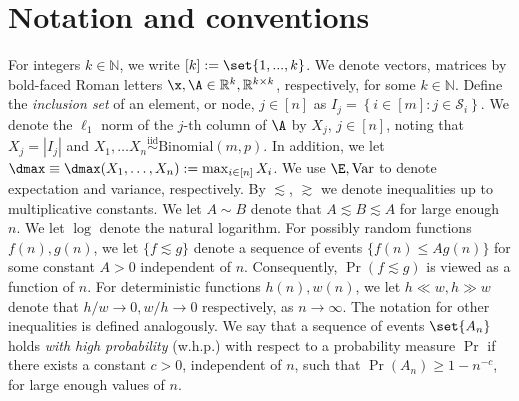 \section{Notation and conventions}\label{sec:notation}
For integers $k \in \mathbb{N}$, we write $[k]:=\set{1,...,k}$. 
We denote vectors, matrices by bold-faced Roman letters $\x, \A \in \mathbb{R}^k, \mathbb{R}^{k \times k}$, respectively, for some $k \in \mathbb{N}$. 
Define the \emph{inclusion set} of an element, or node, $j \in [n]$ as $I_j = \left\{i \in [m] : j \in \mathcal{S}_i \right\}$. 
We denote the $\ell_1$ norm of the $j$-th column of $\A$ by $X_j$, $j\in [n]$, noting that $X_j = |I_j|$ and $X_1, \ldots X_n \overset{\text{iid}}{\sim} \mathrm{Binomial}(m, p)$. 
In addition, we let $\dmax \equiv \dmax(X_1, \ldots, X_n) := \max_{i \in [n]} X_i$. 
We use $\E, \text{Var}$ to denote expectation and variance, respectively. 
By $\lesssim$, $\gtrsim$ we denote inequalities up to multiplicative constants. 
We let $A \sim B$ denote that $A \lesssim B \lesssim A$ for large enough $n$. 
We let $\log$ denote the natural logarithm. 
For possibly random functions \(f(n), g(n)\), we let \(\{f \lesssim g\}\) denote a sequence of events \(\{f(n) \leq A g(n)\}\) for some constant \(A > 0\) independent of \(n\). 
Consequently, \(\Pr(f \lesssim g)\) is viewed as a function of \(n\). For deterministic functions $h(n), w(n)$, we let $h \ll w, h \gg w$ denote that $h/w \to 0, w/h \to 0$ respectively, as $n \to \infty$. 
The notation for other inequalities is defined analogously. 
We say that a sequence of events $\set{A_n}$ holds \emph{with high probability} (w.h.p.) with respect to a probability measure $\Pr$ if there exists a constant $c > 0$, independent of $n$, such that $\Pr(A_n) \geq 1-n^{-c}$, for large enough values of $n$.